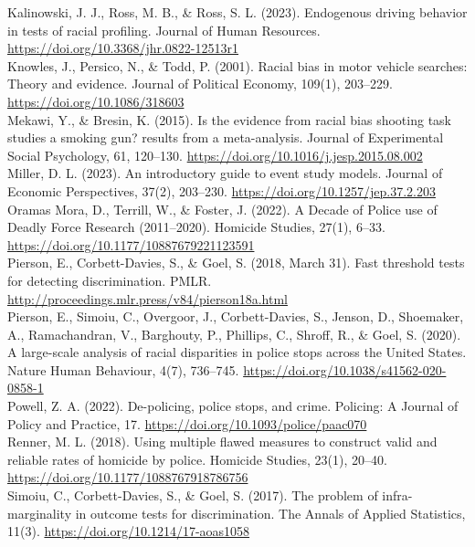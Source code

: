\documentclass[12pt,a4paper]{article}
\begin{document}
Kalinowski, J. J., Ross, M. B., \& Ross, S. L. (2023). Endogenous driving behavior in tests of racial profiling. Journal of Human Resources. \url{https://doi.org/10.3368/jhr.0822-12513r1} \\

Knowles, J., Persico, N., \& Todd, P. (2001). Racial bias in motor vehicle searches: Theory and evidence. Journal of Political Economy, 109(1), 203–229. \url{https://doi.org/10.1086/318603} \\

Mekawi, Y., \& Bresin, K. (2015). Is the evidence from racial bias shooting task studies a smoking gun? results from a meta-analysis. Journal of Experimental Social Psychology, 61, 120–130. \url{https://doi.org/10.1016/j.jesp.2015.08.002} \\

Miller, D. L. (2023). An introductory guide to event study models. Journal of Economic Perspectives, 37(2), 203–230. \url{https://doi.org/10.1257/jep.37.2.203} \\

Oramas Mora, D., Terrill, W., \& Foster, J. (2022). A Decade of Police use of Deadly Force Research (2011–2020). Homicide Studies, 27(1), 6–33. \url{https://doi.org/10.1177/10887679221123591} \\

Pierson, E., Corbett-Davies, S., \& Goel, S. (2018, March 31). Fast threshold tests for detecting discrimination. PMLR. \url{http://proceedings.mlr.press/v84/pierson18a.html} \\

Pierson, E., Simoiu, C., Overgoor, J., Corbett-Davies, S., Jenson, D., Shoemaker, A., Ramachandran, V., Barghouty, P., Phillips, C., Shroff, R., \& Goel, S. (2020). A large-scale analysis of racial disparities in police stops across the United States. Nature Human Behaviour, 4(7), 736–745. \url{https://doi.org/10.1038/s41562-020-0858-1} \\

Powell, Z. A. (2022). De-policing, police stops, and crime. Policing: A Journal of Policy and Practice, 17. \url{https://doi.org/10.1093/police/paac070} \\

Renner, M. L. (2018). Using multiple flawed measures to construct valid and reliable rates of homicide by police. Homicide Studies, 23(1), 20–40. \url{https://doi.org/10.1177/1088767918786756} \\

Simoiu, C., Corbett-Davies, S., \& Goel, S. (2017). The problem of infra-marginality in outcome tests for discrimination. The Annals of Applied Statistics, 11(3). \url{https://doi.org/10.1214/17-aoas1058} \\
\end{document}
